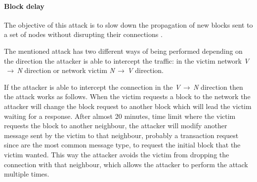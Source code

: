 


\paragraph*{Block delay}
\label{sec:delay}
The objective of this attack is to slow down the propagation of new blocks sent to a set of nodes without disrupting their connections \cite{apostolaki2016hijacking}.

The mentioned attack has two different ways of being performed depending on the direction the attacker is able to intercept the traffic: in the victim network \textit{V$\,\to\,$N} direction or network victim \textit{N$\,\to\,$V} direction.

If the attacker is able to intercept the connection in the \textit{V$\,\to\,$N} direction then the attack works as follows. When the victim requests a block to the network the attacker will change the block request to another block which will lead the victim waiting for a response. After almost 20 minutes, time limit where the victim requests the block to another neighbour, the attacker will modify another message sent by the victim to that neighbour, probably a transaction request since are the most common message type, to request the initial block that the victim wanted. This way the attacker avoids the victim from dropping the connection with that neighbour, which allows the attacker to perform the attack multiple times.


